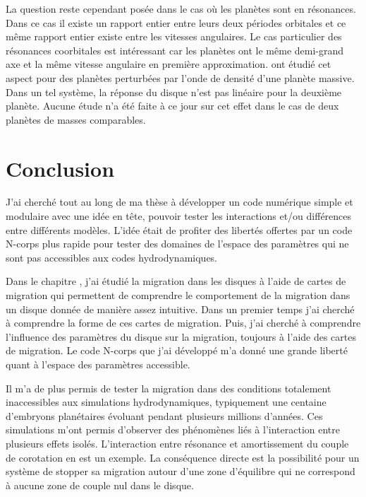 La question reste cependant posée dans le cas où les planètes sont en résonances. Dans ce cas il existe un rapport entier entre leurs deux périodes orbitales et ce même rapport entier existe entre les vitesses angulaires. Le cas particulier des résonances coorbitales est intéressant car les planètes ont le même demi-grand axe et la même vitesse angulaire en première approximation. \cite{podlewska2012outward, baruteau2013disk} ont étudié cet aspect pour des planètes perturbées par l'onde de densité d'une planète massive. Dans un tel système, la réponse du disque n'est pas linéaire pour la deuxième planète. Aucune étude n'a été faite à ce jour sur cet effet dans le cas de deux planètes de masses comparables. 

\section{Conclusion}
J'ai cherché tout au long de ma thèse à développer un code numérique simple et modulaire avec une idée en tête, pouvoir tester les interactions et/ou différences entre différents modèles. L'idée était de profiter des libertés offertes par un code N-corps plus rapide pour tester des domaines de l'espace des paramètres qui ne sont pas accessibles aux codes hydrodynamiques. 

\bigskip

Dans le chapitre , j'ai étudié la migration dans les disques à l'aide de cartes de migration qui permettent de comprendre le comportement de la migration dans un disque donnée de manière assez intuitive. Dans un premier temps j'ai cherché à comprendre la forme de ces cartes de migration. Puis, j'ai cherché à comprendre l'influence des paramètres du disque sur la migration, toujours à l'aide des cartes de migration. Le code N-corps que j'ai développé m'a donné une grande liberté quant à l'espace des paramètres accessible. 

Il m'a de plus permis de tester la migration dans des conditions totalement inaccessibles aux simulations hydrodynamiques, typiquement une centaine d'embryons planétaires évoluant pendant plusieurs millions d'années. Ces simulations m'ont permis d'observer des phénomènes liés à l'interaction entre plusieurs effets isolés. L'interaction entre résonance et amortissement du couple de corotation en est un exemple. La conséquence directe est la possibilité pour un système de stopper sa migration autour d'une zone d'équilibre qui ne correspond à aucune zone de couple nul dans le disque. 

